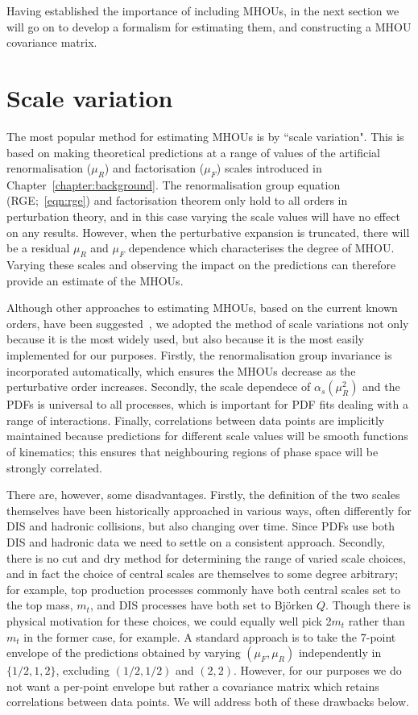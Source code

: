 Having established the importance of including MHOUs, in the next section we will go on to develop a formalism for estimating them, and constructing a MHOU covariance matrix.

\section{Scale variation}
\label{sec:svn}

The most popular method for estimating MHOUs is by ``scale variation". This is based on making theoretical predictions at a range of values of the artificial renormalisation ($\mu_R$) and factorisation ($\mu_F$) scales introduced in Chapter~\ref{chapter:background}. The renormalisation group equation (RGE;~\ref{eqn:rge}) and factorisation theorem only hold to all orders in perturbation theory, and in this case varying the scale values will have no effect on any results. However, when the perturbative expansion is truncated, there will be a residual $\mu_R$ and $\mu_F$ dependence which characterises the degree of MHOU. Varying these scales and observing the impact on the predictions can therefore provide an estimate of the MHOUs. 

Although other approaches to estimating MHOUs, based on the current known orders, have been suggested~\cite{Cacciari:2011ze, David:2013gaa, Bagnaschi:2014wea, Bonvini:2020xeo}, we adopted the method of scale variations not only because it is the most widely used, but also because it is the most easily implemented for our purposes. Firstly, the renormalisation group invariance is incorporated automatically, which ensures the MHOUs decrease as the perturbative order increases. Secondly, the scale dependece of $\alpha_s(\mu_R^2)$ and the PDFs is universal to all processes, which is important for PDF fits dealing with a range of interactions. Finally, correlations between data points are implicitly maintained because predictions for different scale values will be smooth functions of kinematics; this ensures that neighbouring regions of phase space will be strongly correlated.

There are, however, some disadvantages. Firstly, the definition of the two scales themselves have been historically approached in various ways, often differently for DIS and hadronic collisions, but also changing over time. Since PDFs use both DIS and hadronic data we need to settle on a consistent approach. Secondly, there is no cut and dry method for determining the range of varied scale choices, and in fact the choice of central scales are themselves to some degree arbitrary; for example, top production processes commonly have both central scales set to the top mass, $m_t$, and DIS processes have both set to Bj\"orken $Q$. Though there is physical motivation for these choices, we could equally well pick 2$m_t$ rather than $m_t$ in the former case, for example. A standard approach is to take the 7-point envelope of the predictions obtained by varying $(\mu_F, \mu_R)$ independently in $\{1/2, 1, 2\}$, excluding $(1/2, 1/2)$ and $(2,2)$. However, for our purposes we do not want a per-point envelope but rather a covariance matrix which retains correlations between data points. We will address both of these drawbacks below. 

